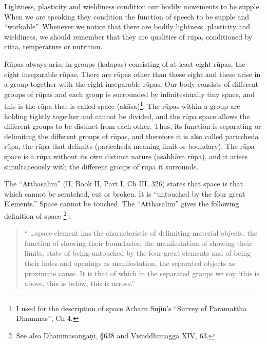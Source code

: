 \documentclass{book}
\begin{document}
Lightness, plasticity and wieldiness condition our bodily movements to
be supple. When we are speaking they condition the function of speech
to be supple and ``workable''. Whenever we notice that there are bodily
lightness, plasticity and wieldiness, we should remember that they are
qualities of r\=upa, conditioned by citta, temperature or nutrition.




R\=upas always arise in groups (kalapas) consisting of at least eight
r\=upas, the eight inseparable r\=upas. There are r\=upas other than
these eight and these arise in a group together with the eight
inseparable r\=upas. Our body consists of different groups of r\=upas
and each group is surrounded by infinitesimally tiny space, and this is
the r\=upa that is called space (ak{\=a}sa)\footnote{I used for the
description of space Acharn Sujin's ``Survey of Paramattha Dhammas'',
Ch 4.}. The r\=upas within a group are holding tightly together and
cannot be divided, and the r\=upa space allows the different groups to
be distinct from each other. Thus, its function is separating or
delimiting the different groups of r\=upas, and therefore it is also
called pariccheda r\=upa, the r\=upa that delimits (pariccheda meaning
limit or boundary). The r\=upa space is a r\=upa without its own
distinct nature (asabh{\=a}va r\=upa), and it arises simultaneously
with the different groups of r\=upa it surrounds. 

The ``Atthas{\=a}lin\=\i'' (II, Book II, Part I, Ch III, 326) states that
space is that which cannot be scratched, cut or broken. It is
``untouched by the four great Elements.'' Space cannot be touched. The
``Atthas{\=a}lin\=\i'' gives the following definition of space
\footnote{See also Dhamma\-sanga\d ni, {\S}638 and Visuddhimagga XIV,
63.} : 




\begin{quote}\begin{flushleft}
`` \ldots space-element has the characteristic of delimiting material
objects, the function of showing their boundaries, the manifestation of
showing their limits, state of being untouched by the four great
elements and of being their holes and openings as manifestation, the
separated objects as proximate cause. It is that of which in the
separated groups we say `this is above, this is below, this is across.''
\end{flushleft}\end{quote}
\end{document}
